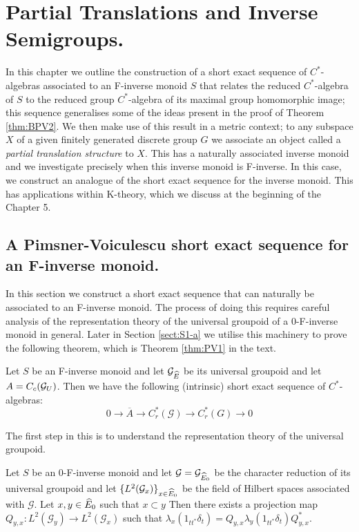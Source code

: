 \chapter{Partial Translations and Inverse Semigroups.}

In this chapter we outline the construction of a short exact sequence of $C^{*}$-algebras associated to an F-inverse monoid $S$ that relates the reduced $C^{*}$-algebra of $S$ to the reduced group $C^{*}$-algebra of its maximal group homomorphic image; this sequence generalises some of the ideas present in the proof of Theorem \ref{thm:BPV2}. We then make use of this result in a metric context; to any subspace $X$ of a given finitely generated discrete group $G$ we associate an object called a \textit{partial translation structure} to $X$. This has a naturally associated inverse monoid and we investigate precisely when this inverse monoid is F-inverse. In this case, we construct an analogue of the short exact sequence for the inverse monoid. This has applications within K-theory, which we discuss at the beginning of the Chapter 5.

\section{A Pimsner-Voiculescu short exact sequence for an F-inverse monoid.}\label{sect:S1}
In this section we construct a short exact sequence that can naturally be associated to an F-inverse monoid. The process of doing this requires careful analysis of the representation theory of the universal groupoid of a 0-F-inverse monoid in general. Later in Section \ref{sect:S1-a} we utilise this machinery to prove the following theorem, which is Theorem \ref{thm:PV1} in the text.

\begin{thm}
Let $S$ be an F-inverse monoid and let $\mathcal{G}_{\widehat{E}}$ be its universal groupoid and let $A=C_{c}(\mathcal{G}_{U})$. Then we have the following (intrinsic) short exact sequence of $C^{*}$-algebras:
\begin{equation*}
0 \rightarrow \overline{A} \rightarrow C^{*}_{r}(\mathcal{G}) \rightarrow C^{*}_{r}(G) \rightarrow 0
\end{equation*}
\end{thm}

The first step in this is to understand the representation theory of the universal groupoid.

\begin{lemma}\label{lem:L2}
Let $S$ be an 0-F-inverse monoid and let $\mathcal{G}=\mathcal{G}_{\widehat{E}_{0}}$ be the character reduction of its universal groupoid and let $\lbrace L^{2}(\mathcal{G}_{x}) \rbrace_{x \in \widehat{E}_{0}}$ be the field of Hilbert spaces associated with $\mathcal{G}$. Let $x,y \in \widehat{E}_{0}$ such that $x \subset y$ Then there exists a projection map $Q_{y,x}: L^{2}(\mathcal{G}_{y}) \rightarrow L^{2}(\mathcal{G}_{x})$ such that $\lambda_{x}(1_{tt^{*}}\delta_{t}) = Q_{y,x}\lambda_{y}(1_{tt^{*}}\delta_{t})Q_{y,x}^{*}$.
\end{lemma}

